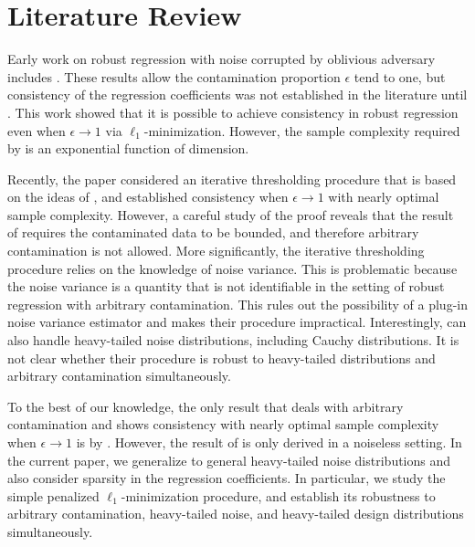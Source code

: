 
\section{Literature Review}

Early work on robust regression with noise corrupted by oblivious adversary includes \cite{wright2010dense,nguyen2013exact,nguyen2012robust}. These results allow the contamination proportion $\epsilon$ tend to one, but consistency of the regression coefficients was not established in the literature until \cite{tsakonas2014convergence}. This work showed that it is possible to achieve consistency in robust regression even when $\epsilon\rightarrow 1$ via $\ell_1$-minimization. However, the sample complexity required by \cite{tsakonas2014convergence} is an exponential function of dimension.

Recently, the paper \cite{suggala2019adaptive} considered an iterative thresholding procedure that is based on the ideas of \cite{jain2014iterative,bhatia2017consistent}, and established consistency when $\epsilon\rightarrow 1$ with nearly optimal sample complexity. However, a careful study of the proof reveals that the result of \cite{suggala2019adaptive} requires the contaminated data to be bounded, and therefore arbitrary contamination is not allowed. More significantly, the iterative thresholding procedure relies on the knowledge of noise variance. This is problematic because the noise variance is a quantity that is not identifiable in the setting of robust regression with arbitrary contamination. This rules out the possibility of a plug-in noise variance estimator and makes their procedure impractical. Interestingly, \cite{suggala2019adaptive} can also handle heavy-tailed noise distributions, including Cauchy distributions. It is not clear whether their procedure is robust to heavy-tailed distributions and arbitrary contamination simultaneously.

To the best of our knowledge, the only result that deals with arbitrary contamination and shows consistency with nearly optimal sample complexity when $\epsilon\rightarrow 1$ is by \cite{gao2020model}. However, the result of \cite{gao2020model} is only derived in a noiseless setting. In the current paper, we generalize \cite{gao2020model} to general heavy-tailed noise distributions and also consider sparsity in the regression coefficients. In particular, we study  the simple penalized $\ell_1$-minimization procedure, and establish its robustness to arbitrary contamination, heavy-tailed noise, and heavy-tailed design distributions simultaneously.

